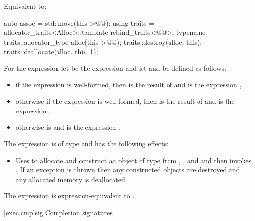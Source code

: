 \begin{itemdescr}
\pnum
\effects
Equivalent to:
\begin{codeblock}
auto assoc = std::move(this->@@);
{
  using traits = allocator_traits<Alloc>::template rebind_traits<@@>;
  typename traits::allocator_type alloc(this->@@);
  traits::destroy(alloc, this);
  traits::deallocate(alloc, this, 1);
}
\end{codeblock}
\end{itemdescr}

\pnum
For the expression 
let  be the expression  and
let  and  be defined as follows:
\begin{itemize}
\item
if the expression  is well-formed, then
 is the result of  and
 is the expression ,
\item
otherwise
if the expression  is well-formed, then
 is the result of  and
 is the expression ,
\item
otherwise
 is  and
 is the expression .
\end{itemize}

\pnum
The expression  is of type  and
has the following effects:
\begin{itemize}
\item
Uses  to allocate and construct an object  of type
from , , and 
and then
invokes .
If an exception is thrown then
any constructed objects are destroyed and any allocated memory is deallocated.
\end{itemize}

\pnum
The expression  is expression-equivalent to
.

[exec.cmplsig]{Completion signatures}

